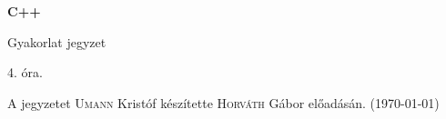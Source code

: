 \documentclass[a4paper,11.5pt]{article}
\begin{document}
	\setlength\parindent{0pt}
	\def\s{\hspace{0.2mm}\vphantom{\beta}}
	\def\Z{\mathbb{Z}}
	\def\Q{\mathbb{Q}}
	\def\R{\mathbb{R}}
	\def\C{\mathbb{C}}
	\def\N{\mathbb{N}}
	\def\Ra{\overline{\mathbb{R}}}
	
	\def\sume{\displaystyle\sum_{n=1}^{+\infty}}
	\def\sumn{\displaystyle\sum_{n=0}^{+\infty}}
	
	\def\narrow{\underset{n\rightarrow+\infty}{\longrightarrow}}
	\def\limn{\displaystyle\lim_{n\to +\infty}}
	\def\limx{\displaystyle\lim_{x\to +\infty}}
	
	\theoremstyle{definition}
	\newtheorem{theorem}{Tétel}[subsection] 
	
	\theoremstyle{definition}
	\newtheorem{definition}[theorem]{Definíció} 
	\newtheorem{example}[theorem]{Példa} 
	\newtheorem{task}[theorem]{Feladat} 
	\newtheorem{note}[theorem]{Megjegyzés}
	\begin{center}
		{\LARGE\textbf{C++}}
		
		{\Large Gyakorlat jegyzet}
		
		4. óra.
	\end{center}
	A jegyzetet \textsc{Umann} Kristóf készítette \textsc{Horváth} Gábor  előadásán. (\today)
	
\end{document}
